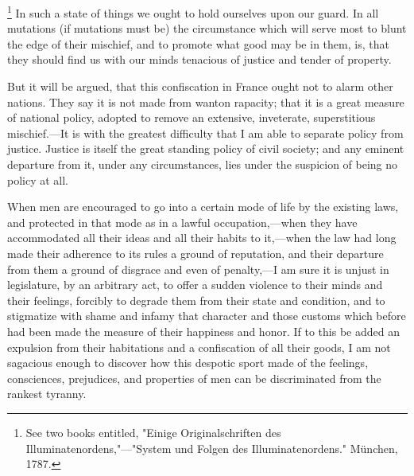 \footnote{ See two books entitled, "Einige Originalschriften des Illuminatenordens,"—"System und Folgen des Illuminatenordens." München, 1787.}
 In such a state of things we ought to hold ourselves upon our guard. In all mutations (if mutations must be) the circumstance which will serve most to blunt the edge of their mischief, and to promote what good may be in them, is, that they should find us with our minds tenacious of justice and tender of property.

But it will be argued, that this confiscation in France ought not to alarm other nations. They say it is not made from wanton rapacity; that it is a great measure of national policy, adopted to remove an extensive, inveterate, superstitious mischief.—It is with the greatest difficulty that I am able to separate policy from justice. Justice is itself the great standing policy of civil society; and any eminent departure from it, under any circumstances, lies under the suspicion of being no policy at all.

When men are encouraged to go into a certain mode of life by the existing laws, and protected in that mode as in a lawful occupation,—when they have accommodated all their ideas and all their habits to it,—when the law had long made their adherence to its rules a ground of reputation, and their departure from them a ground of disgrace and even of penalty,—I am sure it is unjust in legislature, by an arbitrary act, to offer a sudden violence to their minds and their feelings, forcibly to degrade them from their state and condition, and to stigmatize with shame and infamy that character and those customs which before had been made the measure of their happiness and honor. If to this be added an expulsion from their habitations and a confiscation of all their goods, I am not sagacious enough to discover how this despotic sport made of the feelings, consciences, prejudices, and properties of men can be discriminated from the rankest tyranny.

